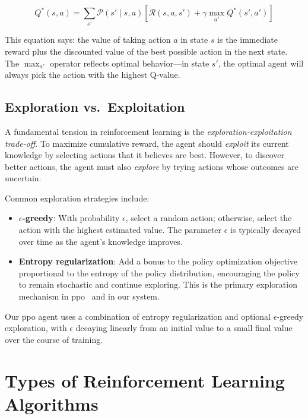 \begin{equation}
    Q^*(s, a) = \sum_{s'} \mathcal{P}(s' \mid s, a) \left[ \mathcal{R}(s, a, s') + \gamma \max_{a'} Q^*(s', a') \right]
\end{equation}

This equation says: the value of taking action $a$ in state $s$ is the immediate reward plus the discounted value of the best possible action in the next state. The $\max_{a'}$ operator reflects optimal behavior---in state $s'$, the optimal agent will always pick the action with the highest Q-value.

\subsection{Exploration vs.\ Exploitation}

A fundamental tension in reinforcement learning is the \textit{exploration-exploitation trade-off}. To maximize cumulative reward, the agent should \textit{exploit} its current knowledge by selecting actions that it believes are best. However, to discover better actions, the agent must also \textit{explore} by trying actions whose outcomes are uncertain.

Common exploration strategies include:

\begin{itemize}
    \item \textbf{$\epsilon$-greedy}: With probability $\epsilon$, select a random action; otherwise, select the action with the highest estimated value. The parameter $\epsilon$ is typically decayed over time as the agent's knowledge improves.
    \item \textbf{Entropy regularization}: Add a bonus to the policy optimization objective proportional to the entropy of the policy distribution, encouraging the policy to remain stochastic and continue exploring. This is the primary exploration mechanism in \gls{ppo}~\cite{schulman2017ppo} and in our system.
\end{itemize}

Our \gls{ppo} agent uses a combination of entropy regularization and optional $\epsilon$-greedy exploration, with $\epsilon$ decaying linearly from an initial value to a small final value over the course of training.

\section{Types of Reinforcement Learning Algorithms}

